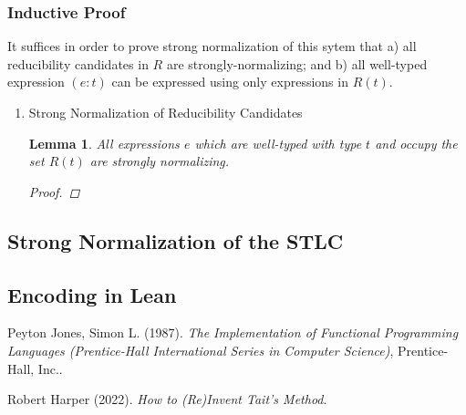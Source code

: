 \documentclass[11pt]{article}
\newtheorem{lemma}[theorem]{Lemma}
\begin{document}
\subsubsection{Inductive Proof}
\label{sec:orgccfb148}

It suffices in order to prove strong normalization of this sytem that a) all reducibility candidates in \(R\) are strongly-normalizing; and b) all well-typed expression \((e : t)\) can be expressed using only expressions in \(R(t)\).
\begin{enumerate}
\item Strong Normalization of Reducibility Candidates
\label{sec:org8c205c7}

\begin{lemma}
All expressions $e$ which are well-typed with type $t$ and occupy the set $R(t)$ are strongly normalizing.
\begin{proof}

\end{proof}
\end{lemma}
\end{enumerate}
\subsection{Strong Normalization of the STLC}
\label{sec:orgceee71f}
\subsection{Encoding in Lean}
\label{sec:org812ec4c}

\noindent
Peyton Jones, Simon L. (1987). \emph{The Implementation of Functional Programming Languages (Prentice-Hall International Series in Computer Science)}, Prentice-Hall, Inc..

\noindent
Robert Harper (2022). \emph{How to (Re)Invent Tait’s Method}.
\end{document}
